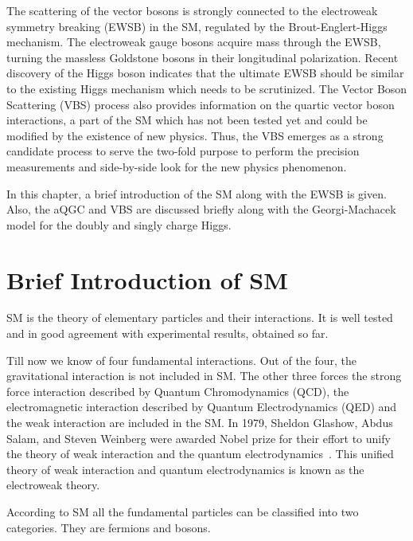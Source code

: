 The scattering of the vector bosons is strongly connected to the electroweak symmetry breaking (EWSB) in the SM, regulated by the Brout-Englert-Higgs mechanism.
The electroweak gauge bosons acquire mass through the EWSB, turning the massless Goldstone bosons in their longitudinal polarization.
Recent discovery of the Higgs boson indicates that the ultimate EWSB should be similar to the existing Higgs mechanism which needs to be scrutinized.
The Vector Boson Scattering (VBS) process also provides information on the quartic vector boson interactions, a part of the SM which has not been tested yet and could be modified by the existence of new physics.
Thus, the VBS  emerges as a strong candidate process to serve the two-fold purpose to perform the precision measurements and side-by-side look for the new physics phenomenon.  

In this chapter, a brief introduction of the SM  along with the EWSB is given. Also, the aQGC and VBS are discussed briefly along with the Georgi-Machacek model for the doubly and singly charge Higgs.

\section{Brief Introduction of SM} %
\label{sec:brief_introduction_of_sm}
SM is the theory of elementary particles and their interactions. It is well tested and in good agreement with experimental results, obtained so far.

Till now we know of four fundamental interactions.
Out of the four, the gravitational interaction is not included in SM.
The other three forces the strong force interaction described by Quantum Chromodynamics (QCD), the electromagnetic interaction described by Quantum Electrodynamics (QED) and the weak interaction are included in the SM.
In 1979, Sheldon Glashow, Abdus Salam, and Steven Weinberg were awarded Nobel prize for their effort to unify the theory of weak interaction and the quantum electrodynamics~\cite{StandardModel67_1,StandardModel67_2}.
This unified theory of weak interaction and quantum electrodynamics is known as the electroweak theory.

According to SM all the fundamental particles can be classified into two categories. They are fermions and bosons.

